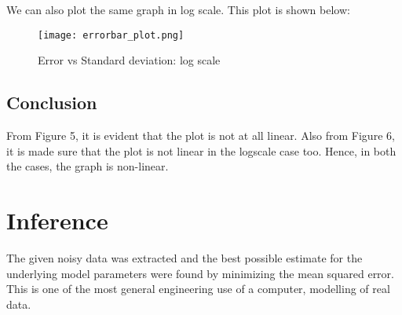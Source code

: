 \documentclass[11pt, a4paper]{article}
\begin{document}
We can also plot the same graph in log scale. This plot is shown below:\\
 	\begin{figure}[!tbh]
   	\centering
   	\texttt{[image: errorbar\_plot.png]}   
   	\caption{Error vs Standard deviation: log scale}
   	\label{fig:sample}
   \end{figure} 
\subsection*{Conclusion}
From Figure 5, it is evident that the plot is not at all linear. Also from Figure 6, it is made sure that the plot is not linear in the logscale case too. Hence, in both the cases, the graph is non-linear.

\section*{Inference}
The given noisy data was extracted and the best possible estimate for the
underlying model parameters were found by minimizing the mean squared
error. This is one of the most general engineering use of a computer, modelling of real data.
 
\end{document}
